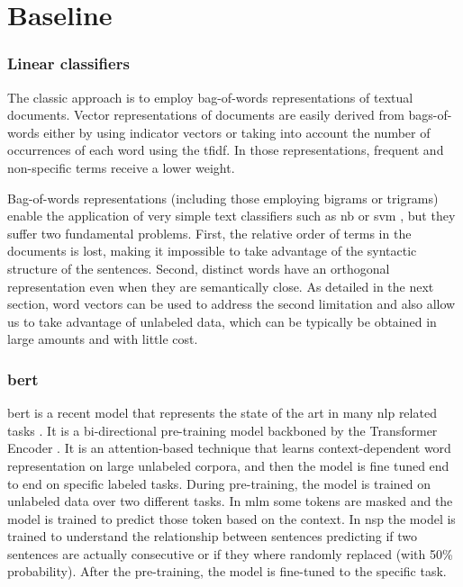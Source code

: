 \section{Baseline}

\subsubsection{Linear classifiers}
The classic approach is to employ bag-of-words
representations of textual documents.
Vector representations of documents are easily
derived from bags-of-words either by using indicator vectors or taking
into account the number of occurrences of each word using the
\ac{tfidf}\cite{manning_introduction_2008}. In those representations,
frequent and non-specific terms receive a lower weight.

Bag-of-words representations (including those employing bigrams or
trigrams) enable the application of very simple text classifiers such
as \ac{nb} or \ac{svm} \cite{cortes-support-1995}, but they
suffer two fundamental problems. First, the relative order of terms in
the documents is lost, making it impossible to take advantage of the
syntactic structure of the sentences. Second, distinct words have an
orthogonal representation even when they are semantically
close. As detailed in the next section, word vectors can be used to
address the second limitation and also allow us to take advantage of
unlabeled data, which can be typically be obtained in large amounts
and with little cost.

\subsubsection{\acs{bert}}
\ac{bert} \cite{devlin2018bert} is a recent model that represents the
state of the art in many \ac{nlp} related tasks
\cite{chatterjee2019semeval,hu2019introductory,lee2019biobert,tshitoyan2019unsupervised}.
It is a
bi-directional pre-training model backboned by the Transformer Encoder
\cite{vaswani2017attention}. It is an attention-based technique that
learns context-dependent word representation on large unlabeled
corpora, and then the model is fine tuned end to end on specific labeled
tasks. During pre-training, the model is trained
on unlabeled data over two different tasks. In \ac{mlm} some tokens
are masked and the model is trained to predict those token based on
the context. In \ac{nsp} the model is trained to understand the
relationship between sentences predicting if two sentences are actually
consecutive or if they where randomly replaced (with 50\%
probability). After the pre-training, the model is fine-tuned to the
specific task.


